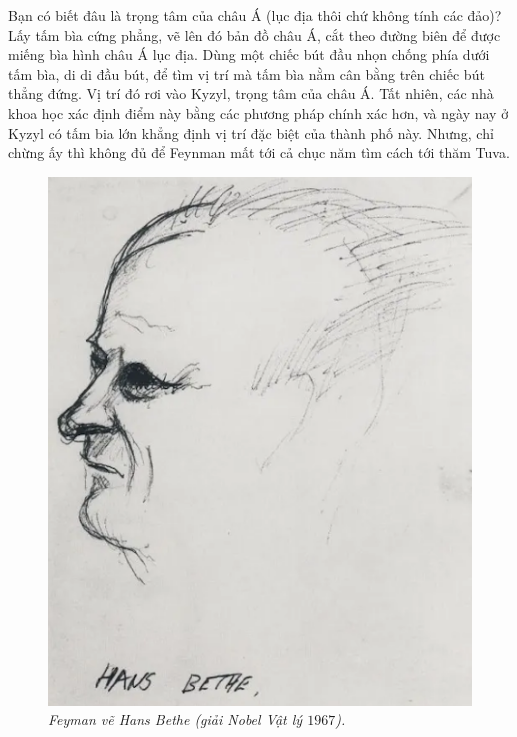 \begin{multicols}{2}
	\vskip 0.1cm
	Bạn có biết đâu là trọng tâm của châu Á (lục địa thôi chứ không tính các đảo)? Lấy tấm bìa cứng phẳng, vẽ lên đó bản đồ châu Á, cắt theo đường biên để được miếng bìa hình châu Á lục địa. Dùng một chiếc bút đầu nhọn chống phía dưới tấm bìa, di di đầu bút, để tìm vị trí mà tấm bìa nằm cân bằng trên chiếc bút thẳng đứng. Vị trí đó rơi vào Kyzyl, trọng tâm của châu Á. Tất nhiên, các nhà khoa học xác định điểm này bằng các phương pháp chính xác hơn, và ngày nay ở Kyzyl có tấm bia lớn khẳng định vị trí đặc biệt của thành phố này. Nhưng, chỉ chừng ấy thì không đủ để Feynman mất tới cả chục năm tìm cách tới thăm Tuva.
	\begin{figure}[H]
		\vspace*{-5pt}
		\centering
		\captionsetup{labelformat= empty, justification=centering}
		\includegraphics[width= 1\linewidth]{3a}
		\caption{\small\textit{\color{quantoan}Feyman vẽ Hans Bethe (giải Nobel Vật lý $1967$).}}
		\vspace*{-10pt}
	\end{figure}

\end{multicols}
